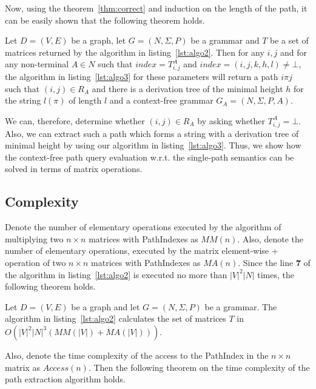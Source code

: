 Now, using the theorem~\ref{thm:correct} and induction on the length of the path, it can be easily shown that the following theorem holds.

\begin{mytheorem}\label{thm:correct_extraction}
	Let $D = (V,E)$ be a graph, let $G =(N,\Sigma,P)$ be a grammar and $T$ be a set of matrices returned by the algorithm in listing~\ref{lst:algo2}. Then for any $i, j$ and for any non-terminal $A \in N$ such that $index = T^A_{i,j}$ and $index = (i,j,k,h,l) \neq \bot$, the algorithm in listing~\ref{lst:algo3} for these parameters will return a path $i \pi j$ such that $(i,j) \in R_A$ and there is a derivation tree of the minimal height $h$ for the string $l(\pi)$ of length $l$ and a context-free grammar $G_A = (N,\Sigma,P,A)$.
\end{mytheorem}

We can, therefore, determine whether $(i,j) \in R_A$ by asking whether $T^A_{i,j} = \bot$. Also, we can extract such a path which forms a string with a derivation tree of minimal height by using our algorithm in listing~\ref{lst:algo3}. Thus, we show how the context-free path query evaluation w.r.t. the single-path semantics can be solved in terms of matrix operations.

\subsection{Complexity}

Denote the number of elementary operations executed by the algorithm of multiplying two $n \times n$ matrices with PathIndexes as $MM(n)$. Also, denote the number of elementary operations, executed by the matrix element-wise + operation of two $n \times n$ matrices with PathIndexes as $MA(n)$. Since the line \textbf{7} of the algorithm in listing~\ref{lst:algo2} is executed no more than $|V|^2|N|$ times, the following theorem holds.

\begin{myproposition}\label{thm:time}
	Let $D = (V,E)$ be a graph and let $G =(N,\Sigma,P)$ be a grammar. The algorithm in listing~\ref{lst:algo2} calculates the set of matrices $T$ in $O(|V|^2|N|^3(MM(|V|) + MA(|V|)))$.
\end{myproposition}

Also, denote the time complexity of the access to the PathIndex in the $n \times n$ matrix as $Access(n)$. Then the following theorem on the time complexity of the path extraction algorithm holds.


